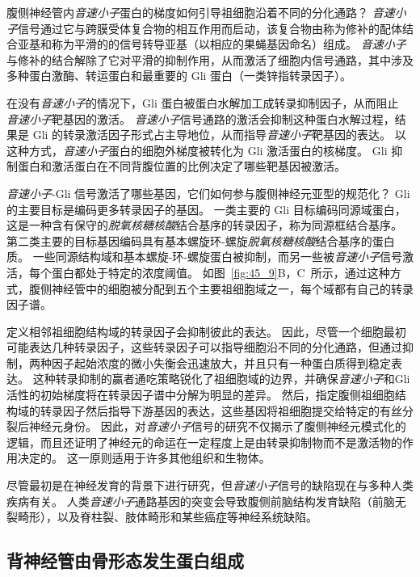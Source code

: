 腹侧神经管内\textit{音速小子}蛋白的梯度如何引导祖细胞沿着不同的分化通路？
\textit{音速小子}信号通过它与跨膜受体复合物的相互作用而启动，该复合物由称为修补的配体结合亚基和称为平滑的的信号转导亚基（以相应的果蝇基因命名）组成。
\textit{音速小子}与修补的结合解除了它对平滑的抑制作用，从而激活了细胞内信号通路，其中涉及多种蛋白激酶、转运蛋白和最重要的 Gli 蛋白（一类锌指转录因子）。


在没有\textit{音速小子}的情况下，Gli 蛋白被蛋白水解加工成转录抑制因子，从而阻止 \textit{音速小子}靶基因的激活。
\textit{音速小子}信号通路的激活会抑制这种蛋白水解过程，结果是 Gli 的转录激活因子形式占主导地位，从而指导\textit{音速小子}靶基因的表达。
以这种方式，\textit{音速小子}蛋白的细胞外梯度被转化为 Gli 激活蛋白的核梯度。
Gli 抑制蛋白和激活蛋白在不同背腹位置的比例决定了哪些靶基因被激活。


\textit{音速小子}-Gli 信号激活了哪些基因，它们如何参与腹侧神经元亚型的规范化？
Gli 的主要目标是编码更多转录因子的基因。
一类主要的 Gli 目标编码同源域蛋白，这是一种含有保守的\textit{脱氧核糖核酸}结合基序的转录因子，称为同源框结合基序。
第二类主要的目标基因编码具有基本螺旋环-螺旋\textit{脱氧核糖核酸}结合基序的蛋白质。
一些同源结构域和基本螺旋-环-螺旋蛋白被抑制，而另一些被\textit{音速小子}信号激活，每个蛋白都处于特定的浓度阈值。
如图~\ref{fig:45_9}B，C~所示，通过这种方式，腹侧神经管中的细胞被分配到五个主要祖细胞域之一，每个域都有自己的转录因子谱。


定义相邻祖细胞结构域的转录因子会抑制彼此的表达。
因此，尽管一个细胞最初可能表达几种转录因子，这些转录因子可以指导细胞沿不同的分化通路，但通过抑制，两种因子起始浓度的微小失衡会迅速放大，并且只有一种蛋白质得到稳定表达。
这种转录抑制的赢者通吃策略锐化了祖细胞域的边界，并确保\textit{音速小子}和Gli活性的初始梯度将在转录因子谱中分解为明显的差异。
然后，指定腹侧祖细胞结构域的转录因子然后指导下游基因的表达，这些基因将祖细胞提交给特定的有丝分裂后神经元身份。
因此，对\textit{音速小子}信号的研究不仅揭示了腹侧神经元模式化的逻辑，而且还证明了神经元的命运在一定程度上是由转录抑制物而不是激活物的作用决定的。
这一原则适用于许多其他组织和生物体。


尽管最初是在神经发育的背景下进行研究，但\textit{音速小子}信号的缺陷现在与多种人类疾病有关。
人类\textit{音速小子}通路基因的突变会导致腹侧前脑结构发育缺陷（前脑无裂畸形），以及脊柱裂、肢体畸形和某些癌症等神经系统缺陷。



\subsection{背神经管由骨形态发生蛋白组成}

